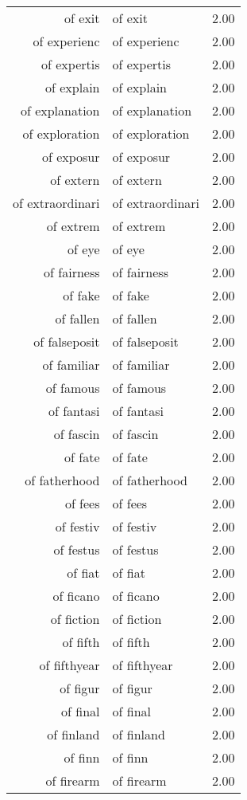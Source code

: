 \begin{table}[ht]
\begin{tabular}{rlr}
  of exit & of exit & 2.00 \\ 
  of experienc & of experienc & 2.00 \\ 
  of expertis & of expertis & 2.00 \\ 
  of explain & of explain & 2.00 \\ 
  of explanation & of explanation & 2.00 \\ 
  of exploration & of exploration & 2.00 \\ 
  of exposur & of exposur & 2.00 \\ 
  of extern & of extern & 2.00 \\ 
  of extraordinari & of extraordinari & 2.00 \\ 
  of extrem & of extrem & 2.00 \\ 
  of eye & of eye & 2.00 \\ 
  of fairness & of fairness & 2.00 \\ 
  of fake & of fake & 2.00 \\ 
  of fallen & of fallen & 2.00 \\ 
  of falseposit & of falseposit & 2.00 \\ 
  of familiar & of familiar & 2.00 \\ 
  of famous & of famous & 2.00 \\ 
  of fantasi & of fantasi & 2.00 \\ 
  of fascin & of fascin & 2.00 \\ 
  of fate & of fate & 2.00 \\ 
  of fatherhood & of fatherhood & 2.00 \\ 
  of fees & of fees & 2.00 \\ 
  of festiv & of festiv & 2.00 \\ 
  of festus & of festus & 2.00 \\ 
  of fiat & of fiat & 2.00 \\ 
  of ficano & of ficano & 2.00 \\ 
  of fiction & of fiction & 2.00 \\ 
  of fifth & of fifth & 2.00 \\ 
  of fifthyear & of fifthyear & 2.00 \\ 
  of figur & of figur & 2.00 \\ 
  of final & of final & 2.00 \\ 
  of finland & of finland & 2.00 \\ 
  of finn & of finn & 2.00 \\ 
  of firearm & of firearm & 2.00 \\ 

\end{tabular}
\end{table}
